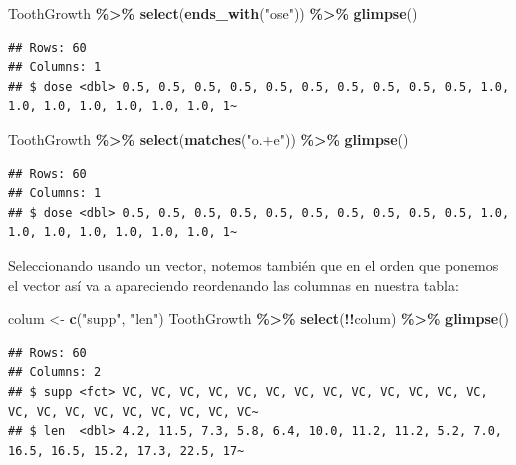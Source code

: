 \documentclass[
]{book}
\newenvironment{Shaded}{\begin{snugshade}}{\end{snugshade}}
\newcommand{\FunctionTok}[1]{\textcolor[rgb]{0.13,0.29,0.53}{\textbf{#1}}}
\newcommand{\NormalTok}[1]{#1}
\newcommand{\OtherTok}[1]{\textcolor[rgb]{0.56,0.35,0.01}{#1}}
\newcommand{\SpecialCharTok}[1]{\textcolor[rgb]{0.81,0.36,0.00}{\textbf{#1}}}
\newcommand{\StringTok}[1]{\textcolor[rgb]{0.31,0.60,0.02}{#1}}
\begin{document}
\begin{Shaded}
\begin{Highlighting}[]
\NormalTok{ToothGrowth }\SpecialCharTok{\%\textgreater{}\%} \FunctionTok{select}\NormalTok{(}\FunctionTok{ends\_with}\NormalTok{(}\StringTok{"ose"}\NormalTok{)) }\SpecialCharTok{\%\textgreater{}\%} \FunctionTok{glimpse}\NormalTok{()}
\end{Highlighting}
\end{Shaded}

\begin{verbatim}
## Rows: 60
## Columns: 1
## $ dose <dbl> 0.5, 0.5, 0.5, 0.5, 0.5, 0.5, 0.5, 0.5, 0.5, 0.5, 1.0, 1.0, 1.0, 1.0, 1.0, 1.0, 1.0, 1~
\end{verbatim}

\begin{Shaded}
\begin{Highlighting}[]
\NormalTok{ToothGrowth }\SpecialCharTok{\%\textgreater{}\%} \FunctionTok{select}\NormalTok{(}\FunctionTok{matches}\NormalTok{(}\StringTok{"o.+e"}\NormalTok{)) }\SpecialCharTok{\%\textgreater{}\%} \FunctionTok{glimpse}\NormalTok{()}
\end{Highlighting}
\end{Shaded}

\begin{verbatim}
## Rows: 60
## Columns: 1
## $ dose <dbl> 0.5, 0.5, 0.5, 0.5, 0.5, 0.5, 0.5, 0.5, 0.5, 0.5, 1.0, 1.0, 1.0, 1.0, 1.0, 1.0, 1.0, 1~
\end{verbatim}

\hfill\break
Seleccionando usando un vector, notemos también que en el orden que ponemos el vector así va a apareciendo reordenando las columnas en nuestra tabla:

\begin{Shaded}
\begin{Highlighting}[]
\NormalTok{colum }\OtherTok{\textless{}{-}} \FunctionTok{c}\NormalTok{(}\StringTok{"supp"}\NormalTok{, }\StringTok{"len"}\NormalTok{)}
\NormalTok{ToothGrowth  }\SpecialCharTok{\%\textgreater{}\%}  \FunctionTok{select}\NormalTok{(}\SpecialCharTok{!!}\NormalTok{colum) }\SpecialCharTok{\%\textgreater{}\%} \FunctionTok{glimpse}\NormalTok{()}
\end{Highlighting}
\end{Shaded}

\begin{verbatim}
## Rows: 60
## Columns: 2
## $ supp <fct> VC, VC, VC, VC, VC, VC, VC, VC, VC, VC, VC, VC, VC, VC, VC, VC, VC, VC, VC, VC, VC, VC~
## $ len  <dbl> 4.2, 11.5, 7.3, 5.8, 6.4, 10.0, 11.2, 11.2, 5.2, 7.0, 16.5, 16.5, 15.2, 17.3, 22.5, 17~
\end{verbatim}
\end{document}
